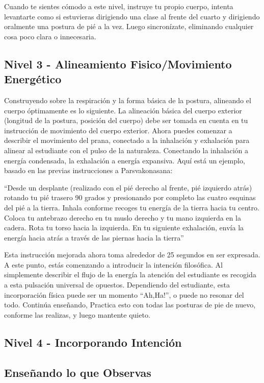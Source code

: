 Cuando te sientes cómodo a este nivel, instruye tu propio cuerpo, intenta levantarte como si estuvieras dirigiendo una clase al frente del cuarto y dirigiendo oralmente una postura de pi\'e a la vez. Luego sincronízate, eliminando cualquier cosa poco clara o innecesaria.

\subsection{Nivel 3 - Alineamiento Fisico/Movimiento Energético}
Construyendo sobre la respiración y la forma básica de la postura, alineando el cuerpo óptimamente es lo siguiente. La alineación básica del cuerpo exterior (longitud de la postura, posición del cuerpo) debe ser tomada en cuenta en tu instrucción de movimiento del cuerpo exterior. Ahora puedes comenzar a describir el movimiento del prana, conectado a la inhalación y exhalación para alinear al estudiante con el pulso de la naturaleza. Conectando la inhalación a energía condensada, la exhalación a energía expansiva. Aquí está un ejemplo, basado en las previas instrucciones a Parsvakonasana:

``Desde un desplante (realizado con el pi\'e derecho al frente, pi\'e izquierdo atrás) rotando tu pi\'e trasero 90 grados y presionando por completo las cuatro esquinas del pi\'e a la tierra. Inhala conforme recoges tu energía de la tierra hacia tu centro. Coloca tu antebrazo derecho en tu muslo derecho y tu mano izquierda en la cadera. Rota tu torso hacia la izquierda. En tu siguiente exhalación, envía la energía hacia atrás a trav\'es de las piernas hacia la tierra''

Esta instrucción mejorada ahora toma alrededor de 25 segundos en ser expresada. A este punto, estás comenzando a introducir la intención filosófica. Al simplemente describir el flujo de la energía la atención del estudiante es recogida a esta pulsación universal de opuestos. Dependiendo del estudiante, esta incorporación física puede ser un momento ``Ah,Ha!'', o puede no resonar del todo. Continúa enseñando, Practica esto con todas las posturas de pie de nuevo, conforme las realizas, y luego mantente quieto.

\subsection{Nivel 4 - Incorporando Intención}
\subsection{Enseñando lo que Observas}
